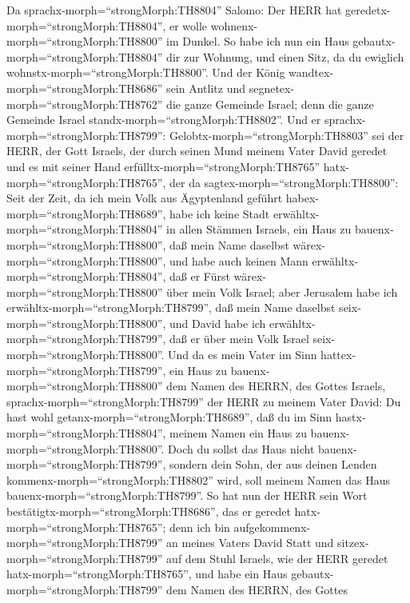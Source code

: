  Da sprachx-morph=``strongMorph:TH8804'' Salomo: Der HERR
hat geredetx-morph=``strongMorph:TH8804'', er wolle
wohnenx-morph=``strongMorph:TH8800'' im Dunkel.  So habe ich
nun ein Haus gebautx-morph=``strongMorph:TH8804'' dir zur Wohnung, und
einen Sitz, da du ewiglich wohnstx-morph=``strongMorph:TH8800''.
 Und der König wandtex-morph=``strongMorph:TH8686'' sein
Antlitz und segnetex-morph=``strongMorph:TH8762'' die ganze Gemeinde
Israel; denn die ganze Gemeinde Israel
standx-morph=``strongMorph:TH8802''.  Und er
sprachx-morph=``strongMorph:TH8799'':
Gelobtx-morph=``strongMorph:TH8803'' sei der HERR, der Gott Israels, der
durch seinen Mund meinem Vater David geredet und es mit seiner Hand
erfülltx-morph=``strongMorph:TH8765'' hatx-morph=``strongMorph:TH8765'',
der da sagtex-morph=``strongMorph:TH8800'':  Seit der Zeit,
da ich mein Volk aus Ägyptenland geführt
habex-morph=``strongMorph:TH8689'', habe ich keine Stadt
erwähltx-morph=``strongMorph:TH8804'' in allen Stämmen Israels, ein Haus
zu bauenx-morph=``strongMorph:TH8800'', daß mein Name daselbst
wärex-morph=``strongMorph:TH8800'', und habe auch keinen Mann
erwähltx-morph=``strongMorph:TH8804'', daß er Fürst
wärex-morph=``strongMorph:TH8800'' über mein Volk Israel; 
aber Jerusalem habe ich erwähltx-morph=``strongMorph:TH8799'', daß mein
Name daselbst seix-morph=``strongMorph:TH8800'', und David habe ich
erwähltx-morph=``strongMorph:TH8799'', daß er über mein Volk Israel
seix-morph=``strongMorph:TH8800''.  Und da es mein Vater im
Sinn hattex-morph=``strongMorph:TH8799'', ein Haus zu
bauenx-morph=``strongMorph:TH8800'' dem Namen des HERRN, des Gottes
Israels,  sprachx-morph=``strongMorph:TH8799'' der HERR zu
meinem Vater David: Du hast wohl getanx-morph=``strongMorph:TH8689'',
daß du im Sinn hastx-morph=``strongMorph:TH8804'', meinem Namen ein Haus
zu bauenx-morph=``strongMorph:TH8800''.  Doch du sollst das
Haus nicht bauenx-morph=``strongMorph:TH8799'', sondern dein Sohn, der
aus deinen Lenden kommenx-morph=``strongMorph:TH8802'' wird, soll meinem
Namen das Haus bauenx-morph=``strongMorph:TH8799''.  So hat
nun der HERR sein Wort bestätigtx-morph=``strongMorph:TH8686'', das er
geredet hatx-morph=``strongMorph:TH8765''; denn ich bin
aufgekommenx-morph=``strongMorph:TH8799'' an meines Vaters David Statt
und sitzex-morph=``strongMorph:TH8799'' auf dem Stuhl Israels, wie der
HERR geredet hatx-morph=``strongMorph:TH8765'', und habe ein Haus
gebautx-morph=``strongMorph:TH8799'' dem Namen des HERRN, des Gottes
